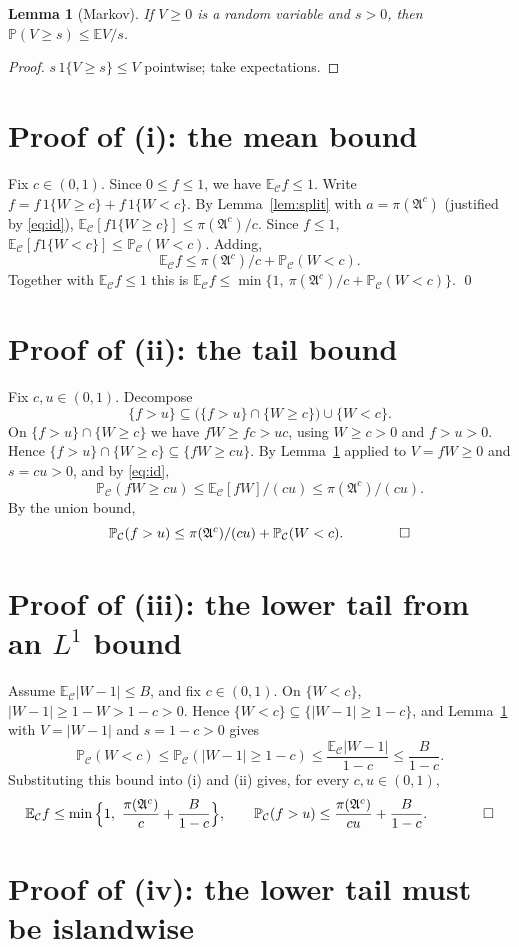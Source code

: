 \documentclass[11pt]{article}
\newtheorem{lemma}{Lemma}
\theoremstyle{remark}
\newcommand{\Pc}{\mathbb{P}_{\mathcal C}}
\newcommand{\Ec}{\mathbb{E}_{\mathcal C}}
\newcommand{\A}{\mathfrak{A}}
\begin{document}
\begin{lemma}[Markov]\label{lem:markov}
If $V\ge0$ is a random variable and $s>0$, then $\mathbb P(V\ge s)\le \mathbb E V/s$.
\end{lemma}
\begin{proof}
$s\,1\{V\ge s\}\le V$ pointwise; take expectations.
\end{proof}

\section{Proof of (i): the mean bound}

Fix $c\in(0,1)$. Since $0\le f\le1$, we have $\Ec f\le1$. Write $f=f\,1\{W\ge c\}+f\,1\{W<c\}$. By
Lemma~\ref{lem:split} with $a=\pi(\A^c)$ (justified by \eqref{eq:id}), $\Ec[f1\{W\ge c\}]\le\pi(\A^c)/c$. Since
$f\le1$, $\Ec[f1\{W<c\}]\le\Pc(W<c)$. Adding,
\[
  \Ec f\le \pi(\A^c)/c+\Pc(W<c).
\]
Together with $\Ec f\le1$ this is $\Ec f\le\min\{1,\ \pi(\A^c)/c+\Pc(W<c)\}$. \qed

\section{Proof of (ii): the tail bound}

Fix $c,u\in(0,1)$. Decompose
\[
  \{f>u\}\subseteq\big(\{f>u\}\cap\{W\ge c\}\big)\cup\{W<c\}.
\]
On $\{f>u\}\cap\{W\ge c\}$ we have $fW\ge fc>uc$, using $W\ge c>0$ and $f>u>0$. Hence
$\{f>u\}\cap\{W\ge c\}\subseteq\{fW\ge cu\}$. By Lemma~\ref{lem:markov} applied to $V=fW\ge0$ and $s=cu>0$, and by
\eqref{eq:id},
\[
  \Pc(fW\ge cu)\le \Ec[fW]/(cu)\le\pi(\A^c)/(cu).
\]
By the union bound,
\[
  \Pc(f>u)\le\pi(\A^c)/(cu)+\Pc(W<c). \qquad\qed
\]

\section{Proof of (iii): the lower tail from an $L^1$ bound}

Assume $\Ec|W-1|\le B$, and fix $c\in(0,1)$. On $\{W<c\}$, $|W-1|\ge 1-W>1-c>0$. Hence
$\{W<c\}\subseteq\{|W-1|\ge 1-c\}$, and Lemma~\ref{lem:markov} with $V=|W-1|$ and $s=1-c>0$ gives
\[
  \Pc(W<c)\le\Pc(|W-1|\ge1-c)\le\frac{\Ec|W-1|}{1-c}\le\frac{B}{1-c}.
\]
Substituting this bound into (i) and (ii) gives, for every $c,u\in(0,1)$,
\[
  \Ec f\le\min\Big\{1,\ \frac{\pi(\A^c)}{c}+\frac{B}{1-c}\Big\},\qquad
  \Pc(f>u)\le\frac{\pi(\A^c)}{cu}+\frac{B}{1-c}. \qquad\qed
\]

\section{Proof of (iv): the lower tail must be islandwise}
\end{document}
